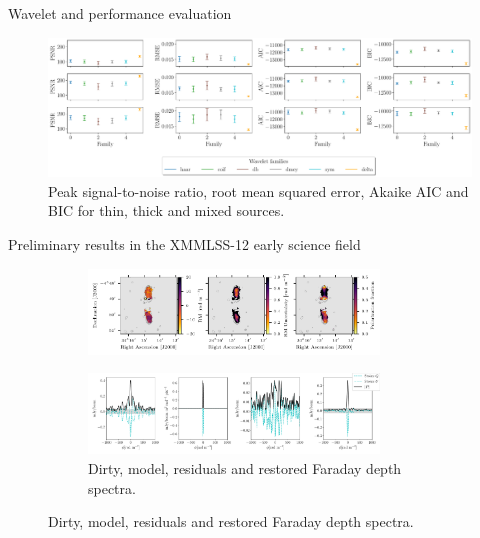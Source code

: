 \documentclass[xetex,aspectratio=169]{beamer}
\begin{document}
    \begin{frame}{Wavelet and performance evaluation}
    \begin{figure}
        \centering
            \includegraphics[width=\textwidth]{figures/wavelets/families_wavelets_meerkat.pdf}
            \caption*{Peak signal-to-noise ratio, root mean squared error, Akaike AIC and BIC for thin, thick and mixed sources.}
        
    \end{figure}
    \end{frame}
    
    
    \begin{frame}{Preliminary results in the XMMLSS-12 early science field}

        \begin{figure}
        \centering
        \begin{subfigure}{\textwidth}
            \centering
            \includegraphics[width=0.85\textwidth]{figures/plot_rm.pdf}
        \end{subfigure}
        \begin{subfigure}{\textwidth}
            \centering
            \includegraphics[width=0.85\textwidth]{figures/los.pdf}
            \caption{Dirty, model, residuals and restored Faraday depth spectra.}
        \end{subfigure}
        
        \end{figure}
    \end{frame}
    
\end{document}
